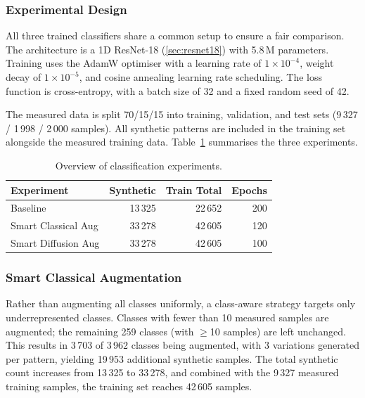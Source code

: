 \subsubsection{Experimental Design}

All three trained classifiers share a common setup to ensure a fair comparison.
The architecture is a 1D ResNet-18 (\ref{sec:resnet18}) with 5.8\,M parameters.
Training uses the AdamW optimiser with a learning rate of $1 \times 10^{-4}$, weight decay of $1 \times 10^{-5}$, and cosine annealing learning rate scheduling.
The loss function is cross-entropy, with a batch size of 32 and a fixed random seed of 42.

The measured data is split 70/15/15 into training, validation, and test sets (9\,327 / 1\,998 / 2\,000 samples).
All synthetic patterns are included in the training set alongside the measured training data.
Table~\ref{tab:experiment-overview} summarises the three experiments.

\begin{table}[htbp]
\centering
\caption{Overview of classification experiments.}
\label{tab:experiment-overview}
\begin{tabular}{lrrr}
\toprule
\textbf{Experiment} & \textbf{Synthetic} & \textbf{Train Total} & \textbf{Epochs} \\
\midrule
Baseline             & 13\,325 & 22\,652 & 200 \\
Smart Classical Aug   & 33\,278 & 42\,605 & 120 \\
Smart Diffusion Aug   & 33\,278 & 42\,605 & 100 \\
\bottomrule
\end{tabular}
\end{table}


\subsubsection{Smart Classical Augmentation}

Rather than augmenting all classes uniformly, a class-aware strategy targets only underrepresented classes.
Classes with fewer than 10 measured samples are augmented; the remaining 259 classes (with $\geq$10 samples) are left unchanged.
This results in 3\,703 of 3\,962 classes being augmented, with 3 variations generated per pattern, yielding 19\,953 additional synthetic samples.
The total synthetic count increases from 13\,325 to 33\,278, and combined with the 9\,327 measured training samples, the training set reaches 42\,605 samples.


